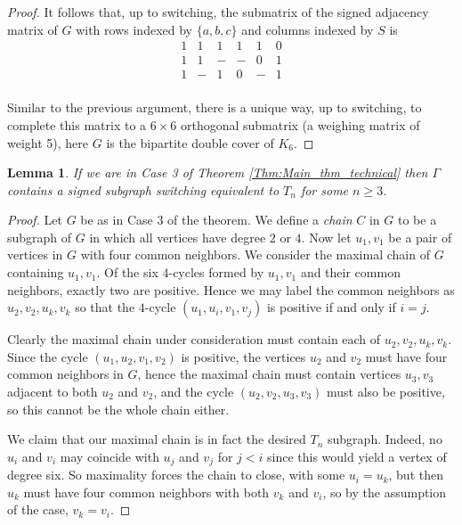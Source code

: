 \documentclass[11pt]{article}
\theoremstyle{plain}
\newtheorem{lemma}[theorem]{Lemma}
\theoremstyle{definition}
\begin{document}
\begin{proof}
It follows that, up to switching, the submatrix of the signed adjacency matrix of $G$ with rows indexed by $\{a,b,c\}$ and columns indexed by $S$ is 
    \[\begin{array}{cccccc}
    1&1&1&1&1&0\\1&1&-&-&0&1\\ 1&-&1&0&-&1\\
    \end{array}\]

Similar to the previous argument, there is  a unique way, up to switching, to complete this matrix to a $6\times 6$ orthogonal submatrix (a weighing matrix of weight 5), here $G$ is the bipartite double cover of $K_6$.
\end{proof}


\begin{lemma}\label{Lem:Tn_subgraph}
    If we are in Case 3 of Theorem \ref{Thm:Main_thm_technical} then $\Gamma$ contains a signed subgraph switching equivalent to $T_n$ for some $n\geqslant 3$.
\end{lemma}

\begin{proof}
Let $G$ be as in Case 3 of the theorem. We define a \textit{chain} $C$ in $G$ to be a subgraph of $G$ in which all vertices have degree $2$ or $4$. Now let $u_1,v_1$ be a pair of vertices in $G$ with four common neighbors. We consider the maximal chain of $G$ containing $u_1,v_1$. Of the six $4$-cycles formed by $u_1,v_1$ and their common neighbors, exactly two are positive. Hence we may label the common neighbors as $u_2,v_2,u_k,v_k$ so that the $4$-cycle $(u_1,u_i,v_1,v_j)$ is positive if and only if $i=j$. 

Clearly the maximal chain under consideration must contain each of $u_2,v_2,u_k,v_k$. Since the cycle $(u_1,u_2,v_1,v_2)$ is positive, the vertices $u_2$ and $v_2$ must have four common neighbors in $G$, hence the maximal chain must contain vertices $u_3,v_3$ adjacent to both $u_2$ and $v_2$, and the cycle $(u_2,v_2,u_3,v_3)$ must also be positive, so this cannot be the whole chain either.

We claim that our maximal chain is in fact the desired $T_n$ subgraph. Indeed, no $u_i$ and $v_i$ may coincide with $u_j$ and $v_j$ for $j<i$ since this would yield a vertex of degree six. So maximality forces the chain to close, with some $u_i=u_k$, but then $u_k$ must have four common neighbors with both $v_k$ and $v_i$, so by the assumption of the case, $v_k=v_i$.
\end{proof}
\end{document}
